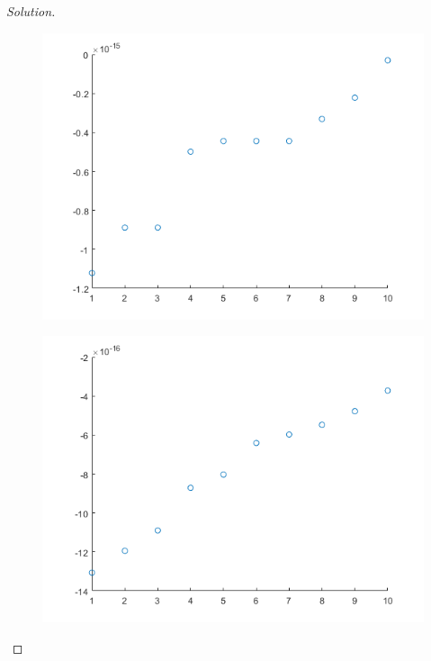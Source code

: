 \documentclass[10pt]{article}
\begin{document}
\begin{proof}[Solution]
\begin{figure}[H]
\centering
\begin{minipage}{.5\textwidth}
  \centering
  \includegraphics[width=\linewidth]{1_sigma}
  \label{fig:test1}
\end{minipage}%
\begin{minipage}{.5\textwidth}
  \centering
  \includegraphics[width=\linewidth]{100_sigma}
  \label{fig:test2}
\end{minipage}
\end{figure}


\end{proof}
\end{document}
